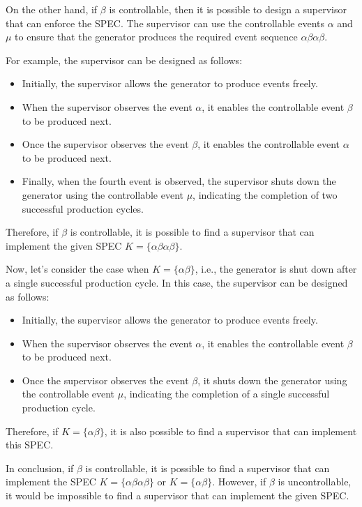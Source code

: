 \documentclass{article}
\begin{document}
On the other hand, if $\beta$ is controllable, then it is possible to design a supervisor that can enforce the SPEC. The supervisor can use the controllable events $\alpha$ and $\mu$ to ensure that the generator produces the required event sequence $\alpha\beta\alpha\beta$.

For example, the supervisor can be designed as follows:

\begin{itemize}
  \item Initially, the supervisor allows the generator to produce events freely.
  \item When the supervisor observes the event $\alpha$, it enables the controllable event $\beta$ to be produced next.
  \item Once the supervisor observes the event $\beta$, it enables the controllable event $\alpha$ to be produced next.
  \item Finally, when the fourth event is observed, the supervisor shuts down the generator using the controllable event $\mu$, indicating the completion of two successful production cycles.
\end{itemize}

Therefore, if $\beta$ is controllable, it is possible to find a supervisor that can implement the given SPEC $K = \{\alpha\beta\alpha\beta\}$.

Now, let's consider the case when $K = \{\alpha\beta\}$, i.e., the generator is shut down after a single successful production cycle. In this case, the supervisor can be designed as follows:

\begin{itemize}
  \item Initially, the supervisor allows the generator to produce events freely.
  \item When the supervisor observes the event $\alpha$, it enables the controllable event $\beta$ to be produced next.
  \item Once the supervisor observes the event $\beta$, it shuts down the generator using the controllable event $\mu$, indicating the completion of a single successful production cycle.
\end{itemize}

Therefore, if $K = \{\alpha\beta\}$, it is also possible to find a supervisor that can implement this SPEC.

In conclusion, if $\beta$ is controllable, it is possible to find a supervisor that can implement the SPEC $K = \{\alpha\beta\alpha\beta\}$ or $K = \{\alpha\beta\}$. However, if $\beta$ is uncontrollable, it would be impossible to find a supervisor that can implement the given SPEC.
\end{document}
